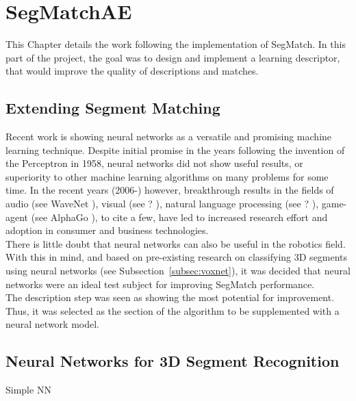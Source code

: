 \chapter{SegMatchAE}
\label{chap:segmatchAE}

This Chapter details the work following the implementation of SegMatch. In this part of the project, the goal was to design and implement a learning descriptor, that would improve the quality of descriptions and matches.\\

\section{Extending Segment Matching}
\label{sec:ae-intro}

Recent work is showing neural networks as a versatile and promising machine learning technique. Despite initial promise in the years following the invention of the Perceptron \cite{perceptron} in 1958, neural networks did not show useful results, or superiority to other machine learning algorithms on many problems for some time. In the recent years (2006-) however, breakthrough results in the fields of audio (see WaveNet \cite{wavenet}), visual (see ? \cite{inception?}), natural language processing (see ? \cite{?}), game-agent (see AlphaGo \cite{alphago}), to cite a few, have led to increased research effort and adoption in consumer \cite{snapchat-face-recognition} and business \cite{google-cooling} technologies.\\

There is little doubt that neural networks can also be useful in the robotics field. With this in mind, and based on pre-existing research on classifying 3D segments using neural networks (see Subsection~\ref{subsec:voxnet}), it was decided that neural networks were an ideal test subject for improving SegMatch performance.\\

The description step was seen as showing the most potential for improvement. Thus, it was selected as the section of the algorithm to be supplemented with a neural network model.\\

\section{Neural Networks for 3D Segment Recognition}
\label{sec:neural-nets}

Simple NN

